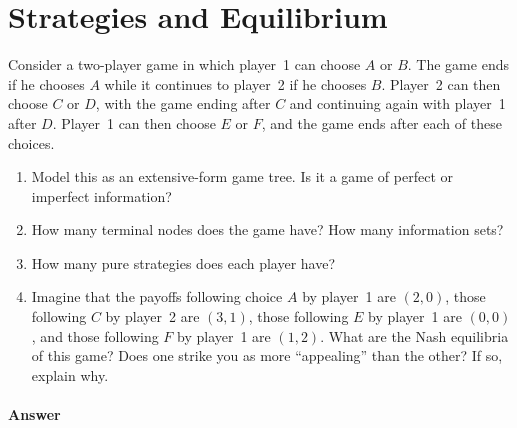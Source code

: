\documentclass[12pt,a4paper]{article}
\begin{document}
\maketitle

\section{Strategies and Equilibrium}
Consider a two-player game in which player~1 can choose $A$ or $B$.
The game ends if he chooses $A$ while it continues to player~2 if he chooses $B$.
Player~2 can then choose $C$ or $D$, with the game ending after $C$ and continuing again with player~1 after $D$.
Player~1 can then choose $E$ or $F$, and the game ends after each of these choices.

\begin{enumerate}[label=\alph*.]
    \item Model this as an extensive-form game tree. Is it a game of perfect or imperfect information?
    \item How many terminal nodes does the game have? How many information sets?
    \item How many pure strategies does each player have?
    \item Imagine that the payoffs following choice $A$ by player~1 are $(2,0)$, those following $C$ by player~2 are $(3,1)$, those following $E$ by player~1 are $(0,0)$, and those following $F$ by player~1 are $(1,2)$. What are the Nash equilibria of this game? Does one strike you as more ``appealing'' than the other? If so, explain why.
\end{enumerate}

\paragraph{Answer}
\end{document}
